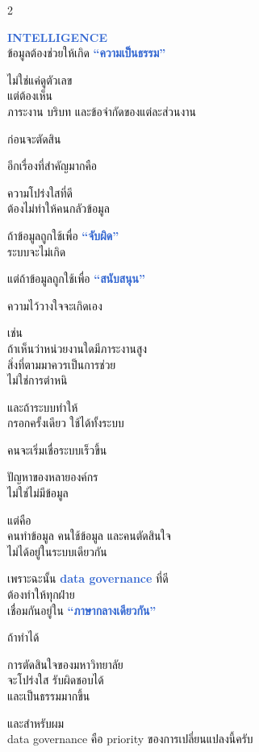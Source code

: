 \documentclass[10pt]{article}
\begin{document}
\begin{tcolorbox}[breakable,colback=panel,colframe=line,boxrule=0.5pt,arc=2mm,left=3mm,right=3mm,top=2mm,bottom=2mm]
\begin{multicols}{2}
\par \textbf{\textcolor{highlight}{INTELLIGENCE}}\\ ข้อมูลต้องช่วยให้เกิด \textbf{\textcolor{highlight}{“ความเป็นธรรม”}}
\par ไม่ใช่แค่ดูตัวเลข\\ แต่ต้องเห็น\\ ภาระงาน บริบท และข้อจำกัดของแต่ละส่วนงาน
\par ก่อนจะตัดสิน
\par อีกเรื่องที่สำคัญมากคือ
\par ความโปร่งใสที่ดี\\ ต้องไม่ทำให้คนกลัวข้อมูล
\par ถ้าข้อมูลถูกใช้เพื่อ \textbf{\textcolor{highlight}{“จับผิด”}}\\ ระบบจะไม่เกิด
\par แต่ถ้าข้อมูลถูกใช้เพื่อ \textbf{\textcolor{highlight}{“สนับสนุน”}}
\par ความไว้วางใจจะเกิดเอง
\par เช่น\\ ถ้าเห็นว่าหน่วยงานใดมีภาระงานสูง\\ สิ่งที่ตามมาควรเป็นการช่วย\\ ไม่ใช่การตำหนิ
\par และถ้าระบบทำให้\\ กรอกครั้งเดียว ใช้ได้ทั้งระบบ
\par คนจะเริ่มเชื่อระบบเร็วขึ้น
\par ปัญหาของหลายองค์กร\\ ไม่ใช่ไม่มีข้อมูล
\par แต่คือ\\ คนทำข้อมูล คนใช้ข้อมูล และคนตัดสินใจ\\ ไม่ได้อยู่ในระบบเดียวกัน
\par เพราะฉะนั้น \textbf{\textcolor{highlight}{data governance}} ที่ดี\\ ต้องทำให้ทุกฝ่าย\\ เชื่อมกันอยู่ใน \textbf{\textcolor{highlight}{“ภาษากลางเดียวกัน”}}
\par ถ้าทำได้
\par การตัดสินใจของมหาวิทยาลัย\\ จะโปร่งใส รับผิดชอบได้\\ และเป็นธรรมมากขึ้น
\par และสำหรับผม\\ data governance คือ priority ของการเปลี่ยนแปลงนี้ครับ
\end{multicols}
\end{tcolorbox}
\end{document}
